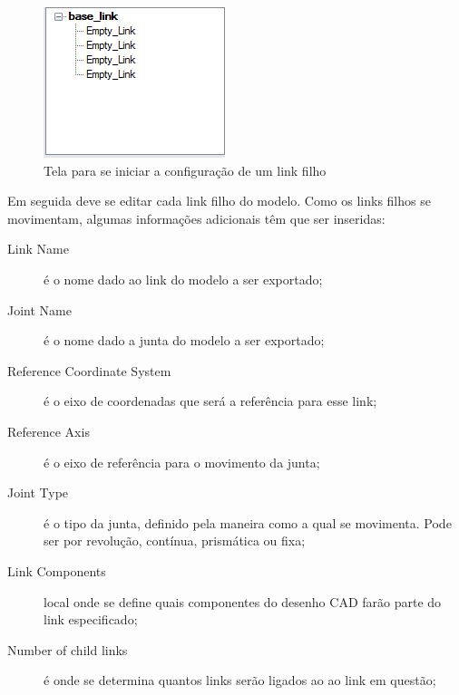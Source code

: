 \begin{figure}[!htb]%
\centering %
\includegraphics[scale=1]{Imagens/ArvoreVazia.JPG} %
\caption{Tela para se iniciar a configuração de um link filho} %
\end{figure} %

Em seguida deve se editar cada link filho do modelo. Como os links filhos se movimentam, algumas informações adicionais têm que ser inseridas:

\begin{description}
\item [Link Name] é o nome dado ao link do modelo a ser exportado;
\item [Joint Name] é o nome dado a junta do modelo a ser exportado;
\item [Reference Coordinate System] é  o eixo de coordenadas que será a referência para esse link; 
\item [Reference Axis] é o eixo de referência para o movimento da junta;
\item [Joint Type] é o tipo da junta, definido pela maneira como a qual se movimenta. Pode ser por revolução, contínua, prismática ou fixa;
\item [Link Components] local onde se define quais componentes do desenho CAD farão parte do link especificado; 
\item [Number of child links] é onde se determina quantos links serão ligados ao ao link em questão;
\end{description}

